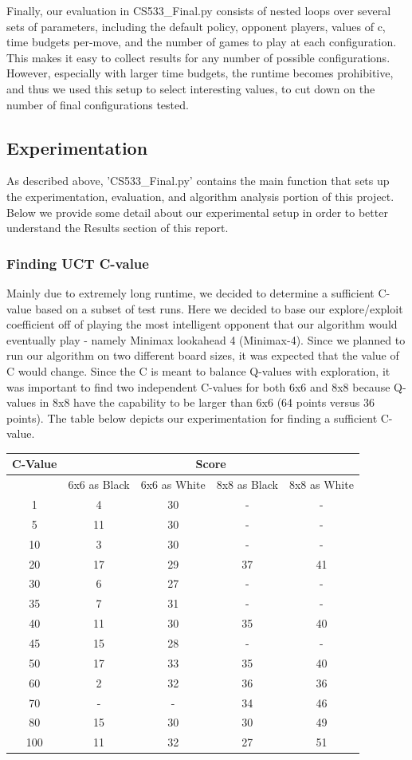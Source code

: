 \documentclass[12pt,letterpaper]{article}
\begin{document}
Finally, our evaluation in CS533\_Final.py consists of nested loops over several sets of parameters, including the default policy, opponent players, values of c, time budgets per-move, and the number of games to play at each configuration. This makes it easy to collect results for any number of possible configurations. However, especially with larger time budgets, the runtime becomes prohibitive, and thus we used this setup to select interesting values, to cut down on the number of final configurations tested.

\subsection{Experimentation}
As described above, 'CS533\_Final.py' contains the main function that sets up the experimentation, evaluation, and algorithm analysis portion of this project. Below we provide some detail about our experimental setup in order to better understand the Results section of this report.

\subsubsection{Finding UCT C-value} 
Mainly due to extremely long runtime, we decided to determine a sufficient C-value based on a subset of test runs. Here we decided to base our explore/exploit coefficient off of playing the most intelligent opponent that our algorithm would eventually play - namely Minimax lookahead 4 (Minimax-4). Since we planned to run our algorithm on two different board sizes, it was expected that the value of C would change. Since the C is meant to balance Q-values with exploration, it was important to find two independent C-values for both 6x6 and 8x8 because Q-values in 8x8 have the capability to be larger than 6x6 (64 points versus 36 points).  The table below depicts our experimentation for finding a sufficient C-value.

\begin{tabular}{|c|c|c|c|c|}
\hline
C-Value & \multicolumn{4}{c|}{Score}\\
\hline 
 & 6x6 as Black & 6x6 as White & 8x8 as Black & 8x8 as White \\ 
\hline 
1 & 4 & 30 & - & - \\ 
\hline 
5 & 11 & 30 & - & - \\ 
\hline 
10 & 3 & 30 & - & - \\ 
\hline 
20 & 17 & 29 & 37 & 41 \\ 
\hline 
30 & 6 & 27 & - & - \\ 
\hline 
35 & 7 & 31 & - & - \\ 
\hline 
40 & 11 & 30 & 35 & 40 \\ 
\hline 
45 & 15 & 28 & - & - \\ 
\hline 
50 & 17 & 33 & 35 & 40 \\ 
\hline 
60 & 2 & 32 & 36 & 36 \\ 
\hline 
70 & - & - & 34 & 46 \\ 
\hline 
80 & 15 & 30 & 30 & 49 \\ 
\hline 
100 & 11 & 32 & 27 & 51 \\ 
\hline 
\end{tabular} 
\end{document}
